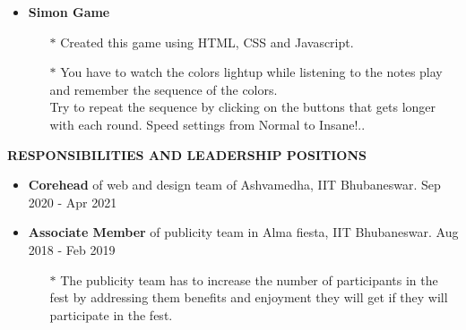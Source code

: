 \documentclass{article}
\begin{document}
{{{{{{{\begin{itemize}
\item   {\bf Simon Game}
\vspace{-2mm}
\begin{itemize}
  \vspace{0.5mm}
  \item[$\ast$] Created this game using HTML, CSS and Javascript.
  \vspace{-0.5mm}
  \item[$\ast$]  You have to watch the colors lightup while listening to the notes play and remember the sequence of the colors.\\ 
 Try to repeat the sequence by clicking on the buttons that gets longer with each round. Speed settings from Normal to Insane!..
\end{itemize}


\end{itemize}




\vspace{4mm}

{\medskip
\large { {\bf  \color[rgb]{0,0,1} RESPONSIBILITIES AND LEADERSHIP POSITIONS}} \hrulefill \par
\normalsize

\begin{itemize}

\item    {\bf Corehead} of web and design team of Ashvamedha, IIT Bhubaneswar. {\hfill Sep 2020 - Apr 2021} 

\item    {\bf Associate Member} of publicity team in Alma fiesta, IIT Bhubaneswar.    			{\hfill Aug 2018 - Feb 2019}
\vspace{-2mm}
\begin{itemize}
  \vspace{0.5mm}
  \item[$\ast$] The publicity team has to increase the number of participants in the fest by addressing them benefits and enjoyment they will get if they will participate in the fest.
  \vspace{-0.5mm}
\end{itemize}



\end{itemize}}}}}}}}}
\end{document}

